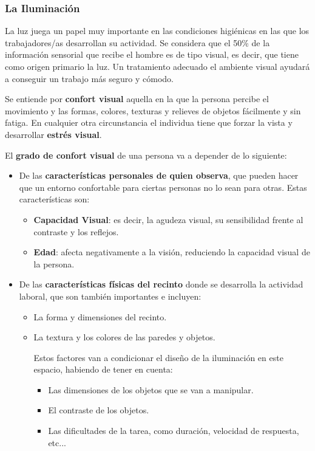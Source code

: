\subsubsection{La Iluminación}
La luz juega un papel muy importante en las condiciones higiénicas en las que los trabajadores/as desarrollan su actividad. Se considera que el 50\% de la información sensorial que recibe el hombre es de tipo visual, es decir, que tiene como origen primario la luz. Un tratamiento adecuado el ambiente visual ayudará a conseguir un trabajo más seguro y cómodo.

Se entiende por \textbf{confort visual} aquella en la que la persona percibe el movimiento y las formas, colores, texturas y relieves de objetos fácilmente y sin fatiga. En cualquier otra circunstancia el individua tiene que forzar la vista y desarrollar \textbf{estrés visual}.

El \textbf{grado de confort visual} de una persona va a depender de lo siguiente:

\begin{itemize}
    \item De las \textbf{características personales de quien observa}, que pueden hacer que un entorno confortable para ciertas personas no lo sean para otras. Estas características son:
    \begin{itemize}
        \item \textbf{Capacidad Visual}: es decir, la agudeza visual, su sensibilidad frente al contraste y los reflejos.
        \item \textbf{Edad}: afecta negativamente a la visión, reduciendo la capacidad visual de la persona.
    \end{itemize}

    \item De las \textbf{características físicas del recinto} donde se desarrolla la actividad laboral, que son también importantes e incluyen:
    \begin{itemize}
        \item La forma y dimensiones del recinto.
        \item La textura y los colores de las paredes y objetos.

        Estos factores van a condicionar el diseño de la iluminación en este espacio, habiendo de tener en cuenta:
        \begin{itemize}
            \item Las dimensiones de los objetos que se van a manipular.
            \item El contraste de los objetos.
            \item Las dificultades de la tarea, como duración, velocidad de respuesta, etc...
        \end{itemize}
    \end{itemize}
\end{itemize}

